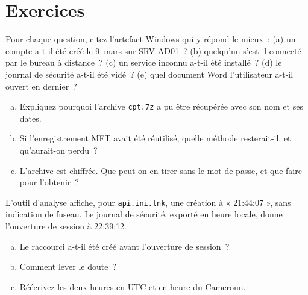 \section*{Exercices}

\begin{boxexo}[title={\ding{45}\quad Exercice~4.1. Quel artefact~? \niveaubase}]
Pour chaque question, citez l'artefact Windows qui y répond le mieux~:
(a) un compte a-t-il été créé le 9~mars sur SRV-AD01~? (b) quelqu'un s'est-il
connecté par le bureau à distance~? (c) un service inconnu a-t-il été
installé~? (d) le journal de sécurité a-t-il été vidé~? (e) quel document
Word l'utilisateur a-t-il ouvert en dernier~?
\end{boxexo}

\begin{boxexo}[title={\ding{45}\quad Exercice~4.2. Récupérer cpt.7z \niveaumoyen}]
\begin{enumerate}[(a)]
    \item Expliquez pourquoi l'archive \texttt{cpt.7z} a pu être récupérée
          avec son nom et ses dates.
    \item Si l'enregistrement MFT avait été réutilisé, quelle méthode
          resterait-il, et qu'aurait-on perdu~?
    \item L'archive est chiffrée. Que peut-on en tirer sans le mot de passe,
          et que faire pour l'obtenir~?
\end{enumerate}
\end{boxexo}

\begin{boxexo}[title={\ding{45}\quad Exercice~4.3. Deux heures pour un fichier \niveaumoyen}]
L'outil d'analyse affiche, pour \texttt{api.ini.lnk}, une création à
« 21:44:07 », sans indication de fuseau. Le journal de sécurité, exporté en
heure locale, donne l'ouverture de session à 22:39:12.
\begin{enumerate}[(a)]
    \item Le raccourci a-t-il été créé avant l'ouverture de session~?
    \item Comment lever le doute~?
    \item Réécrivez les deux heures en UTC et en heure du Cameroun.
\end{enumerate}
\end{boxexo}

